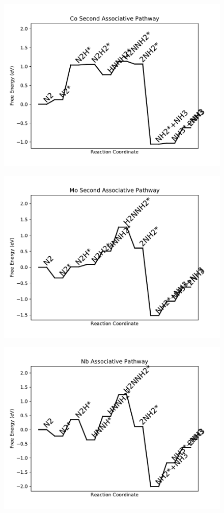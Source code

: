 \begin{figure}
\includegraphics[width=0.8\linewidth]{data/plots/Co_associative_2.pdf}
\end{figure}

\begin{figure}
\includegraphics[width=0.8\linewidth]{data/plots/Mo_associative_2.pdf}
\end{figure}

\begin{figure}
\includegraphics[width=0.8\linewidth]{data/plots/Nb_associative.pdf}
\end{figure}

